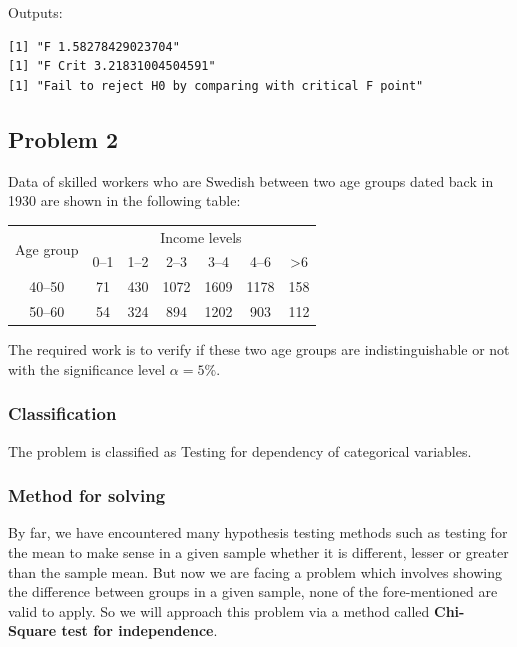 \documentclass[a4paper]{article}
\numberwithin{equation}{section}
\begin{document}
Outputs:
\begin{mdframed}[leftline=false,rightline=false,backgroundcolor=magenta!10,nobreak=true]
  \begin{verbatim}
[1] "F 1.58278429023704"
[1] "F Crit 3.21831004504591"
[1] "Fail to reject H0 by comparing with critical F point"
  \end{verbatim}
\end{mdframed}

\newpage
\subsection{Problem 2}\label{p2}
Data of skilled workers who are Swedish between two age groups dated back in 1930 are shown in the following table:

\begin{center}
  \begin{tabular}{ccccccc}
    \toprule
    \multirow{2}{*}{Age group} & \multicolumn{6}{c}{Income levels}                                   \\
    \cmidrule(lr){2-7}
                               & 0--1                              & 1--2 & 2--3 & 3--4 & 4--6 & >6  \\
    \midrule
    40--50                     & 71                                & 430  & 1072 & 1609 & 1178 & 158 \\
    50--60                     & 54                                & 324  & 894  & 1202 & 903  & 112 \\
    \bottomrule
  \end{tabular}
\end{center}

The required work is to verify if these two age groups are indistinguishable or not with the significance level \( \alpha = 5\% \).

\subsubsection{Classification}
The problem is classified as Testing for dependency of categorical variables.

\subsubsection{Method for solving}
By far, we have encountered many hypothesis testing methods such as testing for the mean to make sense in a given sample whether it is different, lesser or greater than the sample mean. But now we are facing a problem which involves showing the difference between groups in a given sample, none of the fore-mentioned are valid to apply. So we will approach this problem via a method called \textbf{Chi-Square test for independence}.
\end{document}
